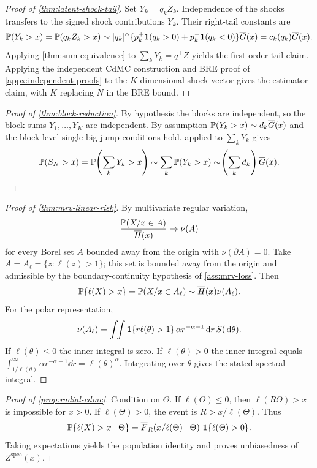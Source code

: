 \begin{proof}[Proof of \cref{thm:latent-shock-tail}]
Set \(Y_k=q_kZ_k\). Independence of the shocks transfers to the signed shock
contributions \(Y_k\). Their right-tail constants are
\[
  \mathbb{P}(Y_k>x)
  =\mathbb{P}(q_kZ_k>x)
  \sim |q_k|^\alpha\{p_k^+\mathbf{1}(q_k>0)+p_k^-\mathbf{1}(q_k<0)\}\overline{G}(x)
  =c_k(q_k)\overline{G}(x).
\]
Applying \cref{thm:sum-equivalence} to \(\sum_kY_k=q^\top Z\) yields the
first-order tail claim. Applying the independent CdMC construction and BRE
proof of \cref{appx:independent-proofs} to the \(K\)-dimensional shock vector
gives the estimator claim, with \(K\) replacing \(N\) in the BRE bound.
\end{proof}

\begin{proof}[Proof of \cref{thm:block-reduction}]
By hypothesis the blocks are independent, so the block sums \(Y_1,\ldots,Y_K\)
are independent. By assumption \(\mathbb{P}(Y_k>x)\sim d_k\overline{G}(x)\) and the block-level
single-big-jump conditions hold.  applied to
\(\sum_kY_k\) gives
\[
  \mathbb{P}(S_N>x)=\mathbb{P}\!\left(\sum_kY_k>x\right)
  \sim \sum_k\mathbb{P}(Y_k>x)
  \sim \!\left(\sum_kd_k\right)\overline{G}(x).
\]
\end{proof}

\begin{proof}[Proof of \cref{thm:mrv-linear-risk}]
By multivariate regular variation,
\[
  \frac{\mathbb{P}(X/x\in A)}{\overline{H}(x)}\to \nu(A)
\]
for every Borel set \(A\) bounded away from the origin with
\(\nu(\partial A)=0\). Take \(A=A_\ell=\{z:\ell(z)>1\}\); this set is bounded
away from the origin and admissible by the boundary-continuity hypothesis of
\cref{ass:mrv-loss}. Then
\[
  \mathbb{P}\{\ell(X)>x\}=\mathbb{P}(X/x\in A_\ell)\sim \overline{H}(x)\nu(A_\ell).
\]
For the polar representation,
\[
  \nu(A_\ell)=\int\!\!\int
  \mathbf{1}\{r\ell(\theta)>1\}\,\alpha r^{-\alpha-1}\,\mathrm{d} r\,S(\,\mathrm{d}\theta).
\]
If \(\ell(\theta)\le 0\) the inner integral is zero. If \(\ell(\theta)>0\) the
inner integral equals \(\int_{1/\ell(\theta)}^\infty \alpha r^{-\alpha-1}\dd r
=\ell(\theta)^\alpha\). Integrating over \(\theta\) gives the stated spectral
integral.
\end{proof}

\begin{proof}[Proof of \cref{prop:radial-cdmc}]
Condition on \(\Theta\). If \(\ell(\Theta)\le 0\), then \(\ell(R\Theta)>x\) is
impossible for \(x>0\). If \(\ell(\Theta)>0\), the event is
\(R>x/\ell(\Theta)\). Thus
\[
  \mathbb{P}\{\ell(X)>x\mid\Theta\}
  =\overline{F}_R\!\left(x/\ell(\Theta)\mid\Theta\right)\,\mathbf{1}\{\ell(\Theta)>0\}.
\]
Taking expectations yields the population identity and proves unbiasedness of
\(Z^{\mathrm{spec}}(x)\).
\end{proof}

